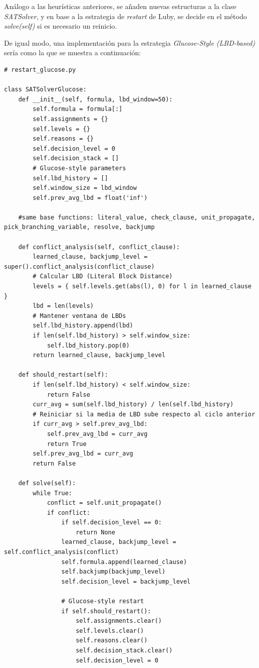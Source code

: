 Análogo a las heurísticas anteriores, se añaden nuevas estructuras a la clase \textit{SATSolver}, y en base a la estrategia de \textit{restart} de Luby, se decide en el método \textit{solve(self)} si es necesario un reinicio.

De igual modo, una implementación para la estrategia \textit{Glucose-Style (LBD-based)} sería como la que se muestra a continuación:

\begin{lstlisting}
# restart_glucose.py

class SATSolverGlucose:
    def __init__(self, formula, lbd_window=50):
        self.formula = formula[:]  
        self.assignments = {}
        self.levels = {}
        self.reasons = {}
        self.decision_level = 0
        self.decision_stack = []
        # Glucose-style parameters
        self.lbd_history = []
        self.window_size = lbd_window
        self.prev_avg_lbd = float('inf')

    #same base functions: literal_value, check_clause, unit_propagate, pick_branching_variable, resolve, backjump

    def conflict_analysis(self, conflict_clause):
        learned_clause, backjump_level = super().conflict_analysis(conflict_clause)
        # Calcular LBD (Literal Block Distance)
        levels = { self.levels.get(abs(l), 0) for l in learned_clause }
        lbd = len(levels)
        # Mantener ventana de LBDs
        self.lbd_history.append(lbd)
        if len(self.lbd_history) > self.window_size:
            self.lbd_history.pop(0)
        return learned_clause, backjump_level

    def should_restart(self):
        if len(self.lbd_history) < self.window_size:
            return False
        curr_avg = sum(self.lbd_history) / len(self.lbd_history)
        # Reiniciar si la media de LBD sube respecto al ciclo anterior
        if curr_avg > self.prev_avg_lbd:
            self.prev_avg_lbd = curr_avg
            return True
        self.prev_avg_lbd = curr_avg
        return False

    def solve(self):
        while True:
            conflict = self.unit_propagate()
            if conflict:
                if self.decision_level == 0:
                    return None
                learned_clause, backjump_level = self.conflict_analysis(conflict)
                self.formula.append(learned_clause)
                self.backjump(backjump_level)
                self.decision_level = backjump_level

                # Glucose-style restart
                if self.should_restart():
                    self.assignments.clear()
                    self.levels.clear()
                    self.reasons.clear()
                    self.decision_stack.clear()
                    self.decision_level = 0


\end{lstlisting}
